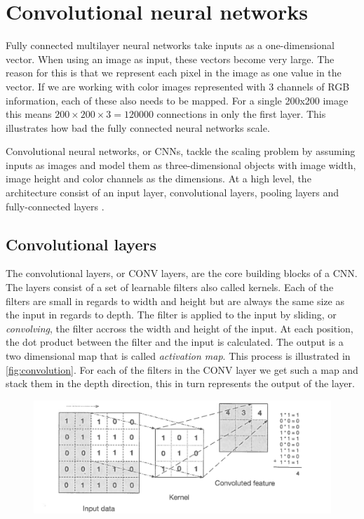 \section{Convolutional neural networks}
Fully connected multilayer neural networks take inputs as a one-dimensional vector. When using an image as input, these vectors become very large. The reason for this is that we represent each pixel in the image as one value in the vector. If we are working with color images represented with 3 channels of RGB information, each of these also needs to be mapped. For a single 200x200 image this means $200 \times 200 \times 3 = 120000$ connections in only the first layer. This illustrates how bad the fully connected neural networks scale.

Convolutional neural networks, or CNNs, tackle the scaling problem by assuming inputs as images and model them as three-dimensional objects with image width, image height and color channels as the dimensions. At a high level, the architecture consist of an input layer, convolutional layers, pooling layers and fully-connected layers \citet{Patterson2017}. 

\subsection{Convolutional layers}
The convolutional layers, or CONV layers, are the core building blocks of a CNN. The layers consist of a set of learnable filters also called kernels. Each of the filters are small in regards to width and height but are always the same size as the input in regards to depth. The filter is applied to the input by sliding, or \emph{convolving}, the filter accross the width and height of the input. At each position, the dot product between the filter and the input is calculated. The output is a two dimensional map that is called \emph{activation map}. This process is illustrated in \autoref{fig:convolution}. For each of the filters in the CONV layer we get such a map and stack them in the depth direction, this in turn represents the output of the layer. 

\begin{figure}[H]
	\centering
	\includegraphics[width=\linewidth]{fig/convolution.png}
	\label{fig:convolution}
\end{figure}

